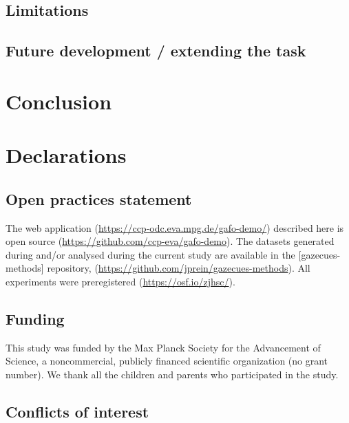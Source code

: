 \documentclass[
  english,
  man,floatsintext]{apa6}
\begin{document}
\hypertarget{limitations-1}{%
\subsection{Limitations}\label{limitations-1}}

\hypertarget{future-development-extending-the-task-1}{%
\subsection{Future development / extending the task}\label{future-development-extending-the-task-1}}

\hypertarget{conclusion-1}{%
\section{Conclusion}\label{conclusion-1}}

\hypertarget{declarations}{%
\section{Declarations}\label{declarations}}

\hypertarget{open-practices-statement}{%
\subsection{Open practices statement}\label{open-practices-statement}}

The web application (\url{https://ccp-odc.eva.mpg.de/gafo-demo/}) described here is open source (\url{https://github.com/ccp-eva/gafo-demo}).
The datasets generated during and/or analysed during the current study are available in the {[}gazecues-methods{]} repository, (\url{https://github.com/jprein/gazecues-methods}). All experiments were preregistered (\url{https://osf.io/zjhsc/}).

\hypertarget{funding}{%
\subsection{Funding}\label{funding}}

This study was funded by the Max Planck Society for the Advancement of Science, a noncommercial, publicly financed scientific organization (no grant number). We thank all the children and parents who participated in the study.

\hypertarget{conflicts-of-interest}{%
\subsection{Conflicts of interest}\label{conflicts-of-interest}}
\end{document}
